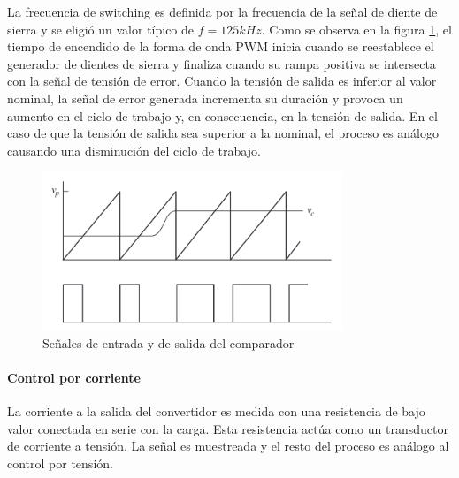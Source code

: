 La frecuencia de switching es definida por la frecuencia de la señal de diente de sierra y se eligió un valor típico de $f=125kHz$.
Como se observa en la figura \ref{fig:pwm-nose}, el tiempo de encendido de la forma de onda PWM inicia cuando se reestablece el generador de dientes de sierra y finaliza cuando su rampa positiva se intersecta con la señal de tensión de error.
Cuando la tensión de salida es inferior al valor nominal, la señal de error generada incrementa su duración y provoca un aumento en el ciclo de trabajo y, en consecuencia, en la tensión de salida. 
En el caso de que la tensión de salida sea superior a la nominal, el proceso es análogo causando una disminución del ciclo de trabajo. 

\begin{figure}[H]
    \centering
    \includegraphics[width=0.8\textwidth]{../images/hart/pwm-info.png}
    \caption{Señales de entrada y de salida del comparador}
    \label{fig:pwm-nose}
\end{figure}

\paragraph{Control por corriente}
La corriente a la salida del convertidor es medida con una resistencia de bajo valor conectada en serie con la carga.
Esta resistencia actúa como un transductor de corriente a tensión.
La señal es muestreada y el resto del proceso es análogo al control por tensión.\\

